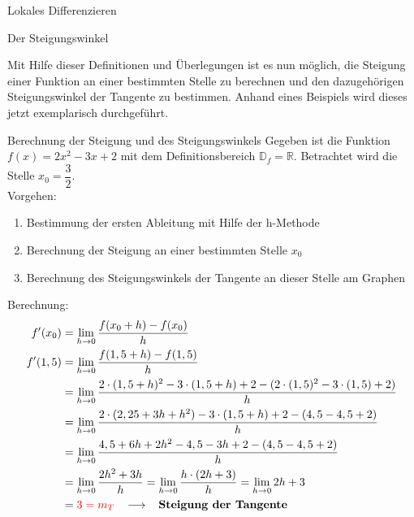 \begin{section}{Lokales Differenzieren}
\begin{bem*}{Der Steigungswinkel}{}
\begin{center}
\end{center}
\end{bem*}
Mit Hilfe dieser Definitionen und Überlegungen ist es nun möglich, die Steigung einer Funktion an einer bestimmten Stelle zu berechnen und den dazugehörigen Steigungswinkel der Tangente zu bestimmen. Anhand eines Beispiels wird dieses jetzt exemplarisch durchgeführt.
\begin{bsp*}{Berechnung der Steigung und des Steigungswinkels}{}
Gegeben ist die Funktion $f(x)= 2x^2 - 3x +2 $ mit dem Definitionsbereich $\mathds{D}_f = \mathds{R}$. Betrachtet wird die Stelle $x_0 = \dfrac{3}{2}$.\\
Vorgehen:
\begin{enumerate}
    \item Bestimmung der ersten Ableitung mit Hilfe der h-Methode
    \item Berechnung der Steigung an einer bestimmten Stelle $x_0$
    \item Berechnung des Steigungswinkels der Tangente an dieser Stelle am Graphen
\end{enumerate}

Berechnung:
\begin{equation*}
\begin{split}
f'(x_0) &= \lim_{h\rightarrow 0} \dfrac{f(x_0+h)-f(x_0)}{h}\\ f'(1,5)&=\lim_{h\rightarrow 0} \dfrac{f(1,5 +h) - f(1,5)}{h}\\ &= \lim_{h\rightarrow 0} \dfrac{2\cdot (1,5 +h)^2 -3\cdot(1,5+h) + 2-(2\cdot (1,5)^2 - 3\cdot (1,5) + 2)}{h}\\
&= \lim_{h\rightarrow 0} \dfrac{2\cdot (2,25 +3h + h^2) -3\cdot(1,5+h) + 2 - (4,5 -4,5 +2)}{h}\\
&= \lim_{h\rightarrow 0} \dfrac{4,5+6h+2h^2-4,5-3h+2-(4,5 -4,5 +2)}{h}\\
&= \lim_{h\rightarrow 0} \dfrac{2h^2+3h}{h}= \lim_{h\rightarrow 0} \dfrac{h\cdot( 2h+3)}{h} = \lim_{h\rightarrow 0} 2h+3\\
&= \textcolor{red}{3 = m_T} \hspace{0.3cm} \longrightarrow \hspace{0.3cm} \textbf{Steigung der Tangente}
\end{split}
\end{equation*}


\end{bsp*}
\end{section}

